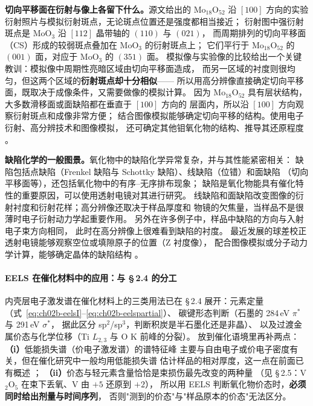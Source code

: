 \begin{principle}
\textbf{切向平移面在衍射与像上各留下什么。}源文给出的 Mo$_{18}$O$_{52}$
沿 $[100]$ 方向的实验衍射照片与模拟衍射斑点，无论斑点位置还是强度都相当接近；
衍射图中强衍射斑点是 MoO$_3$ 沿 $[112]$ 晶带轴的 $(110)$ 与 $(021)$，
而周期排列的切向平移面（CS）形成的较弱斑点叠加在 MoO$_3$ 的衍射斑点上；
它们平行于 Mo$_{18}$O$_{52}$ 的 $(001)$ 面，对应于 MoO$_3$ 的 $(351)$ 面。
模拟像与实验像的比较给出一个关键教训：模拟像中周期性亮暗区域由切向平移面造成，
而另一区域的衬度则很均匀，但这两个区域的\textbf{衍射斑点却十分相似}——
所以用高分辨像直接确定切向平移面，既取决于成像条件，又需要做像的模拟计算。
因为 Mo$_{18}$O$_{52}$ 具有层状结构，大多数滑移面或面缺陷都在垂直于 $[100]$ 方向的
层面内，所以沿 $[100]$ 方向观察衍射斑点和成像非常方便；
结合图像模拟能够确定切向平移的结构。使用电子衍射、高分辨技术和图像模拟，
还可确定其他钼氧化物的结构、推导其还原程度
。

\textbf{缺陷化学的一般图景。}氧化物中的缺陷化学异常复杂，并与其性能紧密相关：
缺陷包括点缺陷（Frenkel 缺陷与 Schottky 缺陷）、线缺陷（位错）和面缺陷
（切向平移面等），还包括氧化物中的有序--无序排布现象；
缺陷是氧化物能具有催化特性的重要原因，可以使用透射电镜对其进行研究。
线缺陷和面缺陷改变图像的衍射衬度和衍射花样；高分辨像还取决于样品厚度和
物镜的欠焦量，当样品不是很薄时电子衍射动力学起重要作用。
另外在许多例子中，样品中缺陷的方向与入射电子束方向相同，
此时在高分辨像上很难看到缺陷的衬度。
最近发展的球差校正透射电镜能够观察空位或填隙原子的位置（Z 衬度像），
配合图像模拟或分子动力学计算，能够确定晶体的缺陷结构
。
\end{principle}

\paragraph{EELS 在催化材料中的应用：与 \S\,2.4 的分工}
内壳层电子激发谱在催化材料上的三类用法已在 \S\,2.4 展开：元素定量
（式~\eqref{eq:ch02b-eelsI}--\eqref{eq:ch02b-eelspartial}）、
碳键形态判断（石墨的 284\,eV $\pi^{*}$ 与 291\,eV $\sigma^{*}$，
据此区分 sp$^{2}$/sp$^{3}$，判断积炭是半石墨化还是非晶）、
以及过渡金属价态与化学位移（Ti $L_{2,3}$ 与 O K 前峰的分裂）。
放到催化语境里再补两点：\textbf{（i）}低能损失谱（价电子激发谱）的谱特征峰
主要与自由电子或价电子密度有关，但在催化研究中一般均用低能损失谱
估计样品的相对厚度，这一点在前面已有概述
；
\textbf{（ii）}价态与轻元素含量恰恰是束损伤最先改变的两种量
（见 \S\,2.5：V$_2$O$_5$ 在束下丢氧、V 由 $+5$ 还原到 $+2$），
所以用 EELS 判断氧化物价态时，\textbf{必须同时给出剂量与时间序列}，
否则"测到的价态"与"样品原本的价态"无法区分。

